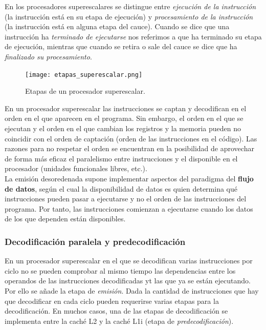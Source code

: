 \documentclass[12pt,spanish]{article}
\begin{document}
En los procesadores superescalares se distingue entre \textit{ejecución de la instrucción} (la instrucción está en su etapa de ejecución) y \textit{procesamiento de la instrucción} (la instrucción está en alguna etapa del cauce). Cuando se dice que una instrucción ha \textit{terminado de ejecutarse} nos referimos a que ha terminado su etapa de ejecución, mientras que cuando se retira o sale del cauce se dice que ha \textit{finalizado su procesamiento}.

\begin{figure}[H]
\centering
\texttt{[image: etapas\_superescalar.png]}
\caption{Etapas de un procesador superescalar.}
\end{figure}

En un procesador superescalar las instrucciones se captan y decodifican en el orden en el que aparecen en el programa. Sin embargo, el orden en el que se ejecutan y el orden en el que cambian los registros y la memoria pueden no coincidir con el orden de captación (orden de las instrucciones en el código). Las razones para no respetar el orden se encuentran en la posibilidad de aprovechar de forma más eficaz el paralelismo entre instrucciones y el disponible en el procesador (unidades funcionales libres, etc.).\\

La emisión desoredenada supone implementar aspectos del paradigma del \textbf{flujo de datos}, según el cual la disponibilidad de datos es quien determina qué instrucciones pueden pasar a ejecutarse y no el orden de las instrucciones del programa. Por tanto, las instrucciones comienzan a ejecutarse cuando los datos de los que dependen están disponibles.\\

\subsubsection{Decodificación paralela y predecodificación}

En un procesador superescalar en el que se decodifican varias instrucciones por ciclo no se pueden comprobar al mismo tiempo las dependencias entre los operandos de las instrucciones decodificadas yt las que ya se están ejecutando. Por ello se añade la etapa de \emph{emisión}. Dada la cantidad de instrucciones que hay que decodificar en cada ciclo pueden requerirse varias etapas para la decodificación. En muchos casos, una de las etapas de decodificación se implementa entre la caché L2 y la caché L1i (etapa de \emph{predecodificación}).\\
\end{document}
